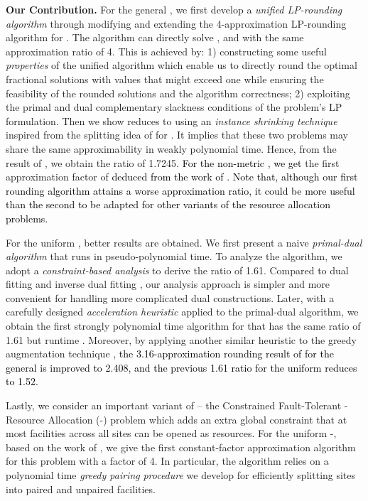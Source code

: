\documentclass[10pt]{llncs}
\begin{document}
\textbf{Our Contribution.} For the general , we first develop
a \textit{unified LP-rounding algorithm }through modifying and extending
the 4-approximation LP-rounding algorithm \cite{Swamy08FTFL2.076}
for . The algorithm can directly solve , 
and  with the same approximation ratio of 4. This is achieved
by: 1) constructing some useful \textit{properties} of the unified
algorithm which enable us to directly round the optimal fractional
solutions with values that might exceed one while ensuring the feasibility
of the rounded solutions and the algorithm correctness; 2) exploiting
the primal and dual complementary slackness conditions of the 
problem's LP formulation. Then we show  reduces to 
using an \textit{instance shrinking technique} inspired from the splitting
idea of \cite{yan2011newresults} for . It implies
that these two problems may share the same approximability in weakly
polynomial time. Hence, from the  result of \cite{JaroslawFTFL1.725},
we obtain the ratio of 1.7245\textcolor{black}{. For the non-metric
, we get }the first approximation factor of \textcolor{black}{
deduced from the work of \cite{Jain00FTFL,Lin92filting}. Note that,
although our first rounding algorithm attains a worse approximation
ratio, it could be more useful than the second to be adapted for other
variants of the resource allocation problems.}

For the uniform , better results are obtained. We first present
a naive \textit{primal-dual algorithm} that runs in pseudo-polynomial
time. To analyze the algorithm, we adopt a \textit{constraint-based
analysis} to derive the ratio of 1.61. Compared to dual fitting \cite{Jain03dualfitting}
and inverse dual fitting \cite{shihongftfa}, our analysis approach
is simpler and more convenient for handling more complicated dual
constructions. Later, with a carefully designed \textit{acceleration
heuristic} applied to the primal-dual algorithm, we obtain the first
strongly polynomial time algorithm for  that has the same ratio
of 1.61 but runtime \textcolor{black}{. }Moreover,
by applying another similar heuristic to the greedy augmentation technique
\cite{Guha03FTFL2.41}, \textcolor{black}{the 3.16-approximation rounding
result of \cite{yan2011approximation} for the general 
is improved to 2.408, and the previous 1.61 ratio for the uniform
} \textcolor{black}{reduces to 1.52.}

Lastly, we consider an important variant of  -- the Constrained
Fault-Tolerant -Resource Allocation (-) problem which
adds an extra global constraint that at most  facilities across
all sites can be opened as resources. For the uniform -,
based on the work of \cite{jain01approximation,Jain03dualfitting,Swamy08FTFL2.076},
we give the first constant-factor approximation algorithm for this
problem with a factor of 4. In particular, the algorithm relies on
a polynomial time \textit{greedy pairing} \textit{procedure} we develop
for efficiently splitting sites into paired and unpaired facilities.
\end{document}
